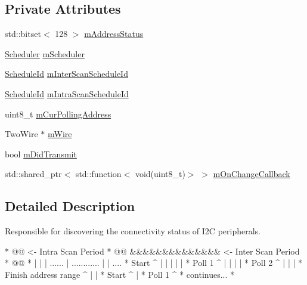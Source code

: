 \subsection*{Private Attributes}
\begin{DoxyCompactItemize}
\item 
std\+::bitset$<$ 128 $>$ \mbox{\hyperlink{class_i2_c_manager_a82811d5e2ea4a92fa7c6016c9411b9a8}{m\+Address\+Status}}
\item 
\mbox{\hyperlink{class_scheduler}{Scheduler}} \mbox{\hyperlink{class_i2_c_manager_a75983e46a08ab8c2887617bf6c4a7c5c}{m\+Scheduler}}
\item 
\mbox{\hyperlink{_scheduler_8h_a1e3b4605bdcbb8f6df7c47013e26e910}{Schedule\+Id}} \mbox{\hyperlink{class_i2_c_manager_a1c998eaf811dfda07e0385ac2ac1b6e8}{m\+Inter\+Scan\+Schedule\+Id}}
\item 
\mbox{\hyperlink{_scheduler_8h_a1e3b4605bdcbb8f6df7c47013e26e910}{Schedule\+Id}} \mbox{\hyperlink{class_i2_c_manager_a412189638428a3fb988e00b33b2a5a62}{m\+Intra\+Scan\+Schedule\+Id}}
\item 
uint8\+\_\+t \mbox{\hyperlink{class_i2_c_manager_ac98624d02c284e76f93179b2bb3d699e}{m\+Cur\+Polling\+Address}}
\item 
Two\+Wire $\ast$ \mbox{\hyperlink{class_i2_c_manager_a48ffd617c38c357bc24bc58182608276}{m\+Wire}}
\item 
bool \mbox{\hyperlink{class_i2_c_manager_ab8109f2cffe7ad1674068cea58afa6e7}{m\+Did\+Transmit}}
\item 
std\+::shared\+\_\+ptr$<$ std\+::function$<$ void(uint8\+\_\+t)$>$ $>$ \mbox{\hyperlink{class_i2_c_manager_a12b17989c484ad7e3c8cbf59786811a5}{m\+On\+Change\+Callback}}
\end{DoxyCompactItemize}


\subsection{Detailed Description}
Responsible for discovering the connectivity status of I2C peripherals. 

\begin{DoxyVerb}*        @@ <- Intra Scan Period
*           @@          &&&&&&&&&&&&&& <- Inter Scan Period
*                                      @@
*       |  |  | ...... | ............ |  | ....
* Start ^  |  |        |              |  |
*   Poll 1 ^  |        |              |  |
*      Poll 2 ^        |              |  |
* Finish address range ^              |  |
*                               Start ^  |
*                                 Poll 1 ^
*                                          continues...
* \end{DoxyVerb}
 

